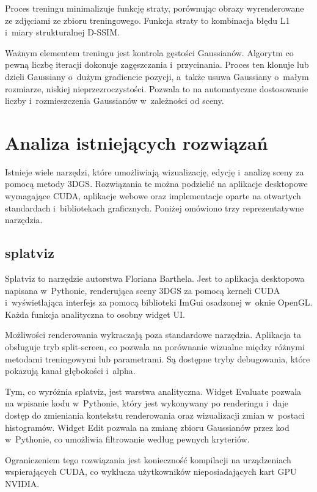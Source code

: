 Proces treningu minimalizuje funkcję straty, porównując obrazy wyrenderowane
ze zdjęciami ze zbioru treningowego. Funkcja straty to kombinacja błędu L1
i~miary strukturalnej D-SSIM.

Ważnym elementem treningu jest kontrola gęstości Gaussianów. Algorytm co pewną
liczbę iteracji dokonuje zagęszczania i~przycinania. Proces ten klonuje lub
dzieli Gaussiany o~dużym gradiencie pozycji, a~także usuwa Gaussiany o~małym
rozmiarze, niskiej nieprzezroczystości. Pozwala to na automatyczne
dostosowanie liczby i~rozmieszczenia Gaussianów w~zależności od sceny.

\section{Analiza istniejących rozwiązań}
\label{sec:analiza}

Istnieje wiele narzędzi, które umożliwiają wizualizację, edycję i~analizę
sceny za pomocą metody 3DGS. Rozwiązania te można podzielić na aplikacje
desktopowe wymagające CUDA, aplikacje webowe oraz implementacje oparte na
otwartych standardach i~bibliotekach graficznych. Poniżej omówiono trzy
reprezentatywne narzędzia.

\subsection{splatviz}
\label{subsec:splatviz}

Splatviz to narzędzie autorstwa Floriana Barthela. Jest to aplikacja
desktopowa napisana w~Pythonie, renderująca sceny 3DGS za pomocą kerneli CUDA
i~wyświetlająca interfejs za pomocą biblioteki ImGui osadzonej w~oknie OpenGL.
Każda funkcja analityczna to osobny widget UI.

Możliwości renderowania wykraczają poza standardowe narzędzia. Aplikacja ta
obsługuje tryb split-screen, co pozwala na porównanie wizualne między różnymi
metodami treningowymi lub parametrami. Są dostępne tryby debugowania, które
pokazują kanał głębokości i~alpha.

Tym, co wyróżnia splatviz, jest warstwa analityczna. Widget Evaluate pozwala
na wpisanie kodu w~Pythonie, który jest wykonywany po renderingu i~daje dostęp
do zmieniania kontekstu renderowania oraz wizualizacji zmian w~postaci
histogramów. Widget Edit pozwala na zmianę zbioru Gaussianów przez kod
w~Pythonie, co umożliwia filtrowanie według pewnych kryteriów.

Ograniczeniem tego rozwiązania jest konieczność kompilacji na urządzeniach
wspierających CUDA, co wyklucza użytkowników nieposiadających kart GPU NVIDIA.

